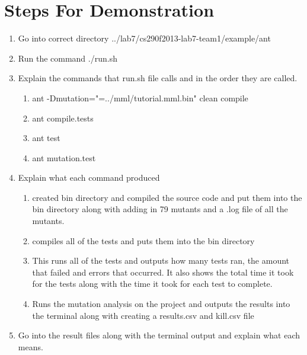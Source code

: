 \documentclass[12pt]{article}
\begin{document}
\vspace*{.1in}
\section{Steps For Demonstration}
\label{sec:eight}
\vspace*{-.1in}

\begin{enumerate}
\item{Go into correct directory ../lab7/cs290f2013-lab7-team1/example/ant}
\item{Run the command ./run.sh}
\item{ Explain the commands that run.sh file calls and in the order they are called.
\begin{enumerate}
\item{ ant -Dmutation="=../mml/tutorial.mml.bin" clean compile}
\item{ant compile.tests}
\item{ ant test}
\item{ant mutation.test}
\end{enumerate}}
\item{Explain what each command produced
\begin{enumerate}
\item{ created bin directory and compiled the source code and put them into the bin directory along 
	    with adding in 79 mutants and a .log file of all the mutants. }
\item{compiles all of the tests and puts them into the bin directory}
\item{ This runs all of the tests and outputs how many tests ran, the amount that failed and errors that 	    occurred. It also shows the total time it took for the tests along with the time it took for each 	  	  test to complete.}
\item{ Runs the mutation analysis on the project and outputs the results into the terminal along with 	 	    creating a results.csv and kill.csv file}
\end{enumerate}}
\item{Go into the result files along with the terminal output and explain what each means.}
\end{enumerate}
\end{document}
